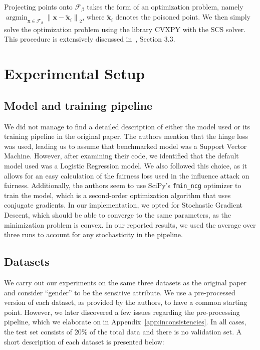 Projecting points onto $\mathcal{F}_\beta$ takes the form of an optimization problem, namely $ \operatorname{argmin}_{\mathbf{x} \in \mathcal{F}_{\beta}}\left\|\mathbf{x}-\tilde{\mathbf{x}}_{i}\right\|_{2}$, where $\tilde{\mathbf{x}}_i$ denotes the poisoned point. We then simply solve the optimization problem using the library CVXPY with the SCS solver. This procedure is extensively discussed in~\cite{koh2018}, Section 3.3.

\section{Experimental Setup}
\subsection{Model and training pipeline}
We did not manage to find a detailed description of either the model used or its training pipeline in the original paper. The authors mention that the hinge loss was used, leading us to assume that benchmarked model was a Support Vector Machine. However, after examining their code, we identified that the default model used was a Logistic Regression model. We also followed this choice, as it allows for an easy calculation of the fairness loss used in the influence attack on fairness. Additionally, the authors seem to use SciPy's \texttt{fmin\_ncg} optimizer to train the model, which is a second-order optimization algorithm that uses conjugate gradients. In our implementation, we opted for Stochastic Gradient Descent, which should be able to converge to the same parameters, as the minimization problem is convex. In our reported results, we used the average over three runs to account for any stochasticity in the pipeline.

\subsection{Datasets}
\label{sec:datasets}
We carry out our experiments on the same three datasets as the original paper and consider ``gender'' to be the sensitive attribute. We use a pre-processed version of each dataset, as provided by the authors, to have a common starting point. However, we later discovered a few issues regarding the pre-processing pipeline, which we elaborate on in Appendix~\ref{app:inconsistencies}. In all cases, the test set consists of 20\% of the total data and there is no validation set. A short description of each dataset is presented below:

